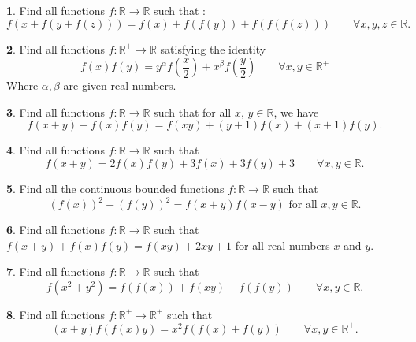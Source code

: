 \documentclass{article}
\theoremstyle{definition}
\newtheorem{p}{}
\begin{document}
\begin{p}
Find all functions $f: \mathbb{R}\to \mathbb{R}$ such that :
\[f(x+f(y+f(z))) = f(x)+ f(f(y)) + f(f(f(z))) \qquad \forall x,y,z \in \mathbb R.\]
\end{p}





\begin{p}
Find all functions $f : \mathbb R^+ \to \mathbb R$ satisfying the identity
\[f(x)f(y)=y^{\alpha}f\left(\frac x2 \right) + x^{\beta} f\left(\frac y2 \right) \qquad \forall x,y \in \mathbb R^+\]
Where $\alpha,\beta$ are given real numbers.
\end{p}



\begin{p}
Find all functions $f:\mathbb{R}\to\mathbb{R}$ such that for all $x\mbox{, }y\in\mathbb{R}$, we have
\[f(x+y)+f(x)f(y)=f(xy)+(y+1)f(x)+(x+1)f(y).\]
\end{p}



\begin{p}
Find all functions $f:\mathbb{R}\to\mathbb{R}$ such that
\[f(x+y)=2f(x)f(y)+3f(x)+3f(y)+3 \qquad \forall x,y \in \mathbb R.\]
\end{p}





\begin{p}
Find all the continuous bounded functions $f: \mathbb R \to \mathbb R$ such that 
\[(f(x))^2 -(f(y))^2  = f(x + y)f(x - y) \text{  for all } x, y \in \mathbb R.\]
\end{p}



\begin{p}
Find all functions $ f: \mathbb{R}\to\mathbb{R}$ such that $f\left(x+y\right)+f\left(x\right)f\left(y\right)=f\left(xy \right)+2xy+1$ for all real numbers $ x$ and $ y$.
\end{p}



\begin{p}
Find all functions $ f: \mathbb{R}\to\mathbb{R}$ such that 
\[ f(x^2+y^2)=f(f(x))+f(xy)+f(f(y))\qquad \forall x,y \in \mathbb R.\]
\end{p}





\begin{p}
Find all functions $ f: \mathbb{R^+}\to\mathbb{R^+}$ such that
\[(x+y)f(f(x)y)=x^2f(f(x)+f(y)) \qquad \forall x,y \in \mathbb R^+.\]
\end{p}
\end{document}

